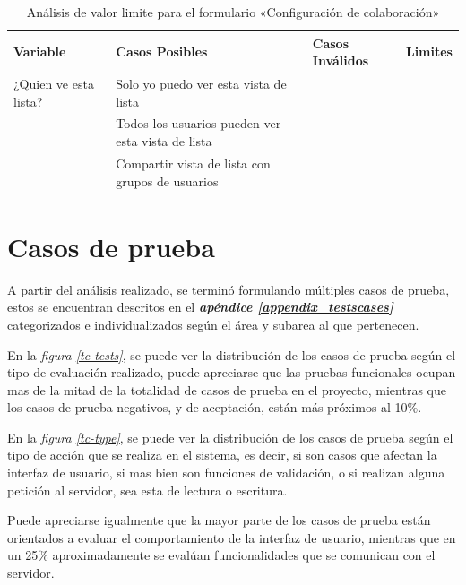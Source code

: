\begin{table}
\centering
\begin{tabular}{|l|l|l|l|}
\hline
\footnotesize{\textbf{Variable}} & \footnotesize{\textbf{Casos Posibles}} & \footnotesize{\textbf{Casos Inválidos}} & \footnotesize{\textbf{Limites}} \\
\hline
\footnotesize{¿Quien ve esta lista?} & \footnotesize{Solo yo puedo ver esta vista de lista} & & \\
& \footnotesize{Todos los usuarios pueden ver esta vista de lista} & & \\
& \footnotesize{Compartir vista de lista con grupos de usuarios} & & \\
\hline
\end{tabular}
\caption{Análisis de valor limite para el formulario «Configuración de colaboración»}
\label{myers_09}
\end{table}

\section{Casos de prueba}
A partir del análisis realizado, se terminó formulando múltiples casos de
prueba, estos se encuentran descritos en el \emph{\textbf{apéndice
\ref{appendix_testscases}}} categorizados e individualizados según el área y
subarea al que pertenecen.

En la \emph{figura \ref{tc-tests}}, se puede ver la distribución de los casos de
prueba según el tipo de evaluación realizado, puede apreciarse que las pruebas
funcionales ocupan mas de la mitad de la totalidad de casos de prueba en el
proyecto, mientras que los casos de prueba negativos, y de aceptación, están más
próximos al 10\%.

En la \emph{figura \ref{tc-type}}, se puede ver la distribución de los casos de
prueba según el tipo de acción que se realiza en el sistema, es decir, si son
casos que afectan la interfaz de usuario, si mas bien son funciones de
validación, o si realizan alguna petición al servidor, sea esta de lectura o
escritura.

Puede apreciarse igualmente que la mayor parte de los casos de prueba están
orientados a evaluar el comportamiento de la interfaz de usuario, mientras que
en un 25\% aproximadamente se evalúan funcionalidades que se comunican con el
servidor.

